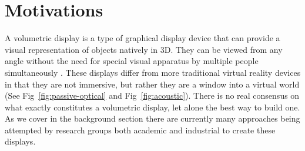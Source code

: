\section{Motivations}
A volumetric display is a type of graphical display device that can provide a visual representation of objects natively in 3D. They can be viewed from any angle without the need for special visual apparatus by multiple people simultaneously \cite{1492264}. These displays differ from more traditional virtual reality devices in that they are not immersive, but rather they are a window into a virtual world (See Fig~\ref{fig:passive-optical} and Fig~\ref{fig:acoustic}). There is no real consensus on what exactly constitutes a volumetric display, let alone the best way to build one. As we cover in the background section there are currently many approaches being attempted by research groups both academic and industrial to create these displays. 
 
